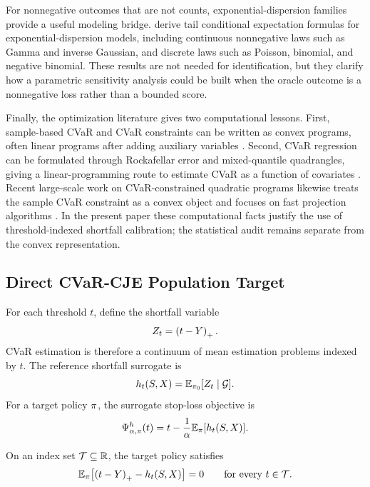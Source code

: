 For nonnegative outcomes that are not counts, exponential-dispersion families
provide a useful modeling bridge. \citet{LandsmanValdez2005} derive tail
conditional expectation formulas for exponential-dispersion models, including
continuous nonnegative laws such as Gamma and inverse Gaussian, and discrete
laws such as Poisson, binomial, and negative binomial. These results are not
needed for identification, but they clarify how a parametric sensitivity
analysis could be built when the oracle outcome is a nonnegative loss rather
than a bounded score.

Finally, the optimization literature gives two computational lessons. First,
sample-based CVaR and CVaR constraints can be written as convex programs, often
linear programs after adding auxiliary variables
\citep{RockafellarUryasev2000,RockafellarUryasev2002}. Second, CVaR regression
can be formulated through Rockafellar error and mixed-quantile quadrangles,
giving a linear-programming route to estimate CVaR as a function of covariates
\citep{GolodnikovKuzmenkoUryasev2019}. Recent large-scale work on
CVaR-constrained quadratic programs likewise treats the sample CVaR constraint
as a convex object and focuses on fast projection algorithms
\citep{LuxenbergPerezPineiroDiamondBoyd2025}. In the present paper these
computational facts justify the use of threshold-indexed shortfall calibration;
the statistical audit remains separate from the convex representation.

\subsection{Direct CVaR-CJE Population Target}

For each threshold $t$, define the shortfall variable
\begin{equation}
Z_t=\left(t-Y\right)_{+}.
\end{equation}
CVaR estimation is therefore a continuum of mean estimation problems indexed
by $t$. The reference shortfall surrogate is
\begin{equation}
h_t(S,X)=\mathbb{E}_{\pi_{0}}[Z_t\mid \mathcal{G}].
\end{equation}
For a target policy $\pi$, the surrogate stop-loss objective is
\begin{equation}
\Psi^h_{\alpha,\pi}(t)
=t-\frac{1}{\alpha}\mathbb{E}_\pi[h_t(S,X)].
\label{eq:formal-surrogate-stoploss}
\end{equation}

\begin{assumption}
\label{ass:shortfall-transport}
On an index set $\mathcal{T}\subseteq\mathbb{R}$, the target policy satisfies
\begin{equation}
\mathbb{E}_\pi\!\left[\left(t-Y\right)_{+}-h_t(S,X)\right]=0
\qquad\text{for every }t\in\mathcal{T}.
\end{equation}
\end{assumption}

